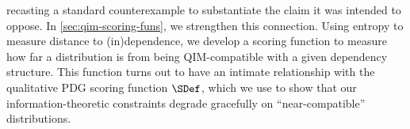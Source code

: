 recasting a standard counterexample to substantiate the claim it was intended to oppose.
In \cref{sec:qim-scoring-funs}, we strengthen this connection. Using entropy to measure distance to (in)dependence, we develop a scoring function to measure how far a distribution is from being QIM-compatible with a given dependency 
structure.  
This function turns out to have an intimate relationship with the qualitative PDG scoring function $\SDef$, which we use to 
show that our information-theoretic constraints degrade gracefully on ``near-compatible'' distributions.


